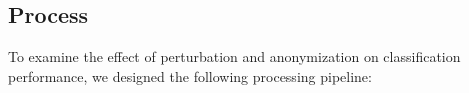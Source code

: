 \documentclass{llncs}
\begin{document}


\subsection{Process}
\label{ssect:process}

To examine the effect of perturbation and anonymization on classification performance, we designed the following processing pipeline:


\end{document}
